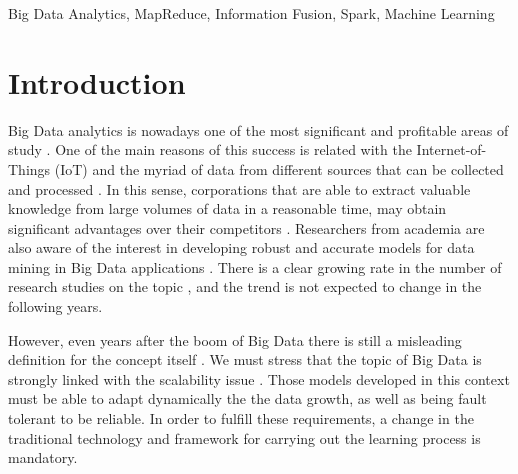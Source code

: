 \documentclass[3p,review]{elsarticle}
\begin{document}
\begin{frontmatter}
\begin{abstract}

\end{abstract}

\begin{keyword}
Big Data Analytics, MapReduce, Information Fusion, Spark, Machine Learning
\end{keyword}

\end{frontmatter}

\section{Introduction}\label{sec:intro}


Big Data analytics is nowadays one of the most significant and profitable areas of study \cite{Chen12-BI-BD, Min13-BDAnalBook, Kam14, Fer14}. One of the main reasons of this success is related with the Internet-of-Things (IoT) and the myriad of data from different sources that can be collected and processed \cite{Fuqaha15-IoT, Xu14-IoT}. In this sense, corporations that are able to extract valuable knowledge from large volumes of data in a reasonable time, may obtain significant advantages over their competitors \cite{Lar16-BI,Choi17-BDAnal}. Researchers from academia are also aware of the interest in developing robust and accurate models for data mining in Big Data applications \cite{Wu14-DMBD,Wix14-BDAcad}. There is a clear growing rate in the number of research studies on the topic \cite{Abb16-BDIS}, and the trend is not expected to change in the following years.

However, even years after the boom of Big Data there is still a misleading definition for the concept itself \cite{Gan15-BDhype}. We must stress that the topic of Big Data is strongly linked with the scalability issue \cite{Hu14-ScalBDAnal}. Those models developed in this context must be able to adapt dynamically the the data growth, as well as being fault tolerant to be reliable. In order to fulfill these requirements, a change in the traditional technology and framework for carrying out the learning process is mandatory. 
\end{document}
